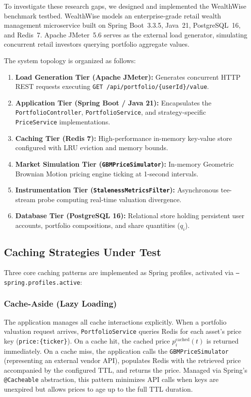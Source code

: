 \documentclass[11pt,a4paper]{article}
\begin{document}
To investigate these research gaps, we designed and implemented the WealthWise benchmark testbed. WealthWise models an enterprise-grade retail wealth management microservice built on Spring Boot~3.3.5, Java~21, PostgreSQL~16, and Redis~7. Apache JMeter~5.6 serves as the external load generator, simulating concurrent retail investors querying portfolio aggregate values.

The system topology is organized as follows:
\begin{enumerate}
  \item \textbf{Load Generation Tier (Apache JMeter):} Generates concurrent HTTP REST requests executing \texttt{GET /api/portfolio/\{userId\}/value}.
  \item \textbf{Application Tier (Spring Boot / Java 21):} Encapsulates the \texttt{PortfolioController}, \texttt{PortfolioService}, and strategy-specific \texttt{PriceService} implementations.
  \item \textbf{Caching Tier (Redis 7):} High-performance in-memory key-value store configured with LRU eviction and memory bounds.
  \item \textbf{Market Simulation Tier (\texttt{GBMPriceSimulator}):} In-memory Geometric Brownian Motion pricing engine ticking at 1-second intervals.
  \item \textbf{Instrumentation Tier (\texttt{StalenessMetricsFilter}):} Asynchronous tee-stream probe computing real-time valuation divergence.
  \item \textbf{Database Tier (PostgreSQL 16):} Relational store holding persistent user accounts, portfolio compositions, and share quantities ($q_i$).
\end{enumerate}

\subsection{Caching Strategies Under Test}

Three core caching patterns are implemented as Spring profiles, activated via \texttt{--spring.profiles.active}:

\subsubsection{Cache-Aside (Lazy Loading)}
The application manages all cache interactions explicitly. When a portfolio valuation request arrives, \texttt{PortfolioService} queries Redis for each asset's price key (\texttt{price:\{ticker\}}). On a cache hit, the cached price $p_i^{\text{cached}}(t)$ is returned immediately. On a cache miss, the application calls the \texttt{GBMPriceSimulator} (representing an external vendor API), populates Redis with the retrieved price accompanied by the configured TTL, and returns the price. Managed via Spring's \texttt{@Cacheable} abstraction, this pattern minimizes API calls when keys are unexpired but allows prices to age up to the full TTL duration.
\end{document}
